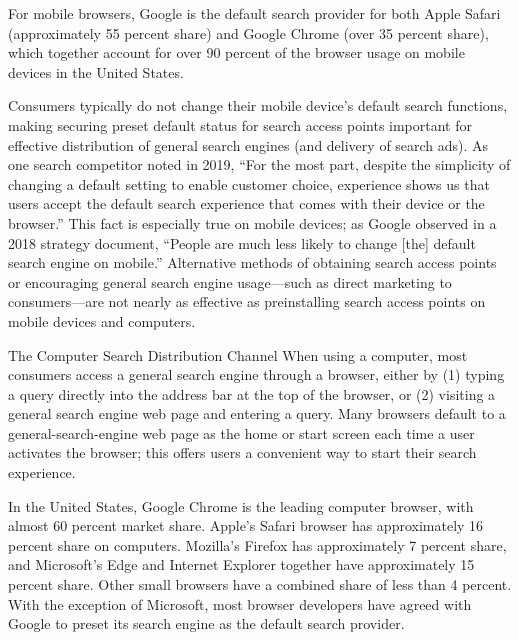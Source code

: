 \documentclass[11pt,b5paper]{scrartcl}
\begin{document}

For mobile browsers, Google is the default search provider for both Apple Safari
(approximately 55 percent share) and Google Chrome (over 35 percent share), which together
account for over 90 percent of the browser usage on mobile devices in the United States.


Consumers typically do not change their mobile device’s default search functions,
making securing preset default status for search access points important for effective distribution
of general search engines (and delivery of search ads). As one search competitor noted in 2019,
“For the most part, despite the simplicity of changing a default setting to enable customer choice,
experience shows us that users accept the default search experience that comes with their device
or the browser.” This fact is especially true on mobile devices; as Google observed in a 2018
strategy document, “People are much less likely to change [the] default search engine on
mobile.” Alternative methods of obtaining search access points or encouraging general search
engine usage—such as direct marketing to consumers—are not nearly as effective as
preinstalling search access points on mobile devices and computers.




The Computer Search Distribution Channel
When using a computer, most consumers access a general search engine through a
browser, either by (1) typing a query directly into the address bar at the top of the browser, or
(2) visiting a general search engine web page and entering a query. Many browsers default to a
general-search-engine web page as the home or start screen each time a user activates the
browser; this offers users a convenient way to start their search experience.


In the United States, Google Chrome is the leading computer browser, with
almost 60 percent market share. Apple’s Safari browser has approximately 16 percent share on
computers. Mozilla’s Firefox has approximately 7 percent share, and Microsoft’s Edge and
Internet Explorer together have approximately 15 percent share. Other small browsers have a
combined share of less than 4 percent. With the exception of Microsoft, most browser developers
have agreed with Google to preset its search engine as the default search provider.
\end{document}
